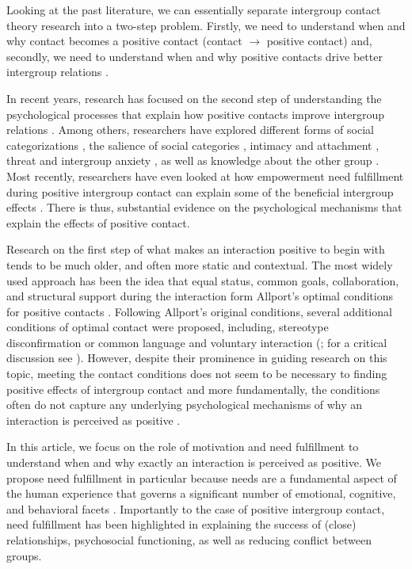 \documentclass[man, 12pt, a4paper, mask]{apa7}
\theoremstyle{break}
\theoremstyle{plain}
\begin{document}
Looking at the past literature, we can essentially separate intergroup contact theory research into a two-step problem. Firstly, we need to understand when and why contact becomes a positive contact (contact $\rightarrow$ positive contact) and, secondly, we need to understand when and why positive contacts drive better intergroup relations \citep[positive contact $\rightarrow$ better relations; e.g., see ][]{Allport1954b, Hewstone1996, Pettigrew1998}.

In recent years, research has focused on the second step of understanding the psychological processes that explain how positive contacts improve intergroup relations \citep[e.g. see,][]{Paolini2021}. Among others, researchers have explored different forms of social categorizations \citep[][]{Pettigrew1998}, the salience of social categories \citep[][]{Brown2005}, intimacy \citep[e.g.,][]{Marinucci2021} and attachment \citep[e.g.,][]{Tropp2021}, threat and intergroup anxiety \citep[e.g.,][]{Stephan2008}, as well as knowledge about the other group \citep[][]{Pettigrew2008c}. Most recently, researchers have even looked at how empowerment need fulfillment during positive intergroup contact can explain some of the beneficial intergroup effects \citep[][]{Hassler2021}. There is thus, substantial evidence on the psychological mechanisms that explain the effects of positive contact.

Research on the first step of what makes an interaction positive to begin with tends to be much older, and often more static and contextual. The most widely used approach has been the idea that equal status, common goals, collaboration, and structural support during the interaction form Allport's optimal conditions for positive contacts \citep[][]{Allport1954b, Pettigrew1969}. Following Allport's original conditions, several additional conditions of optimal contact were proposed, including, stereotype disconfirmation \citep[][]{cook1978} or common language and voluntary interaction (\citealp{wagner1986}; for a critical discussion see \citealp{Pettigrew1986}). However, despite their prominence in guiding research on this topic, meeting the contact conditions does not seem to be necessary to finding positive effects of intergroup contact \citep[][]{Pettigrew2006} and more fundamentally, the conditions often do not capture any underlying psychological mechanisms of why an interaction is perceived as positive \citep[e.g.,][]{Pettigrew1998}.

In this article, we focus on the role of motivation and need fulfillment to understand when and why exactly an interaction is perceived as positive. We propose need fulfillment in particular because needs are a fundamental aspect of the human experience that governs a significant number of emotional, cognitive, and behavioral facets \citep[][]{kreienkamp2022d, kruglanski2002}. Importantly to the case of positive intergroup contact, need fulfillment has been highlighted in explaining the success of (close) relationships, psychosocial functioning, as well as reducing conflict between groups.
\end{document}
